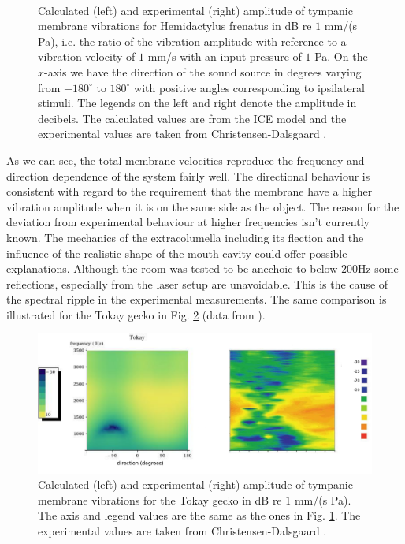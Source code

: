 \begin{figure}
\begin{subfigure}[b]{0.29\textwidth}
        \end{subfigure}
        ~ %
 \caption[Vibration amplitude for the common house gecko]{Calculated (left) and experimental (right) amplitude of tympanic membrane vibrations for Hemidactylus frenatus
 in dB re $1$ mm/(s Pa), i.e. the ratio of the vibration amplitude with reference to a vibration velocity of $1$ mm/s with an input pressure of $1$ Pa. On the $x$-axis we have
 the direction of the sound source in degrees varying from $-180^\circ\mbox{ to }180^\circ$ with positive angles corresponding to ipsilateral stimuli. The legends on the left and
 right denote the amplitude in decibels. The calculated values are from the ICE model and the experimental values are taken from Christensen-Dalsgaard \cite{dalsgaardmanley2}.}
  \label{hemidactylusvibampfull}
\end{figure}

As we can see, the total membrane velocities reproduce the frequency and direction dependence of the system fairly well. The directional behaviour is consistent with regard
to the requirement that the membrane have a higher vibration amplitude when it is on the same side as the object. The reason for the deviation from experimental behaviour at 
higher frequencies isn't currently known. The mechanics of the extracolumella including its flection and the influence of the realistic shape of the mouth cavity could offer possible explanations.
Although the room was tested to be anechoic to below $200$Hz some reflections, especially from
the laser setup are unavoidable. This is the cause of the spectral ripple in the experimental measurements. The same comparison is illustrated for the Tokay gecko in Fig. \ref{tokayvibampfull} (data from \cite{dalsgaardmanley1}).
\begin{figure}[ht!]
 \centering
 \includegraphics[width=1.0\linewidth]{Diagrams/Plots/tokayvibampfull.png}
 \caption[Vibration amplitude for the Tokay gecko]{Calculated (left) and experimental (right) amplitude of tympanic membrane vibrations for the Tokay gecko
 in dB re $1$ mm/(s Pa). The axis and legend values are the same as the ones in Fig. \ref{hemidactylusvibampfull}. The experimental values are taken from Christensen-Dalsgaard \cite{dalsgaardmanley1}.}
  \label{tokayvibampfull}
\end{figure}

